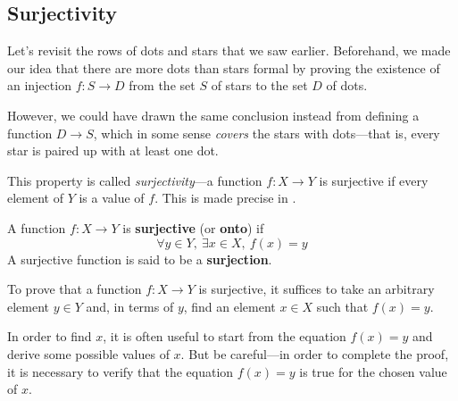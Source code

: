 \subsection*{Surjectivity}

Let's revisit the rows of dots and stars that we saw earlier.  Beforehand, we made our idea that there are more dots than stars formal by proving the existence of an injection $f : S \to D$ from the set $S$ of stars to the set $D$ of dots.

However, we could have drawn the same conclusion instead from defining a function $D \to S$, which in some sense \textit{covers} the stars with dots---that is, every star is paired up with at least one dot.

\begin{center}
\end{center}

This property is called \textit{surjectivity}---a function $f : X \to Y$ is surjective if every element of $Y$ is a value of $f$. This is made precise in .

\begin{definition}
\label{defSurjective}\label{defSurjection}
A function $f : X \to Y$ is \textbf{surjective} (or \textbf{onto}) if
\[ \forall y \in Y,\ \exists x \in X,\ f(x) = y \]
A surjective function is said to be a \textbf{surjection}.
\end{definition}

\begin{strategy}
To prove that a function $f : X \to Y$ is surjective, it suffices to take an arbitrary element $y \in Y$ and, in terms of $y$, find an element $x \in X$ such that $f(x)=y$.

In order to find $x$, it is often useful to start from the equation $f(x)=y$ and derive some possible values of $x$. But be careful---in order to complete the proof, it is necessary to verify that the equation $f(x)=y$ is true for the chosen value of $x$.
\end{strategy}

